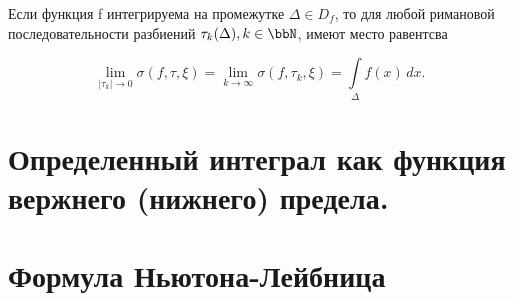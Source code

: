 \begin{thm}
Если функция f интегрируема на промежутке $\Delta \in D_f$, то для любой римановой последовательности разбиений $\tau_k(\Delta), k\in \bbN$, имеют место равентсва

\begin{equation} \label{ch11.1eq1}
\lim_{|\tau_k| \to 0} \sigma(f, \tau, \xi) = \lim_{k \to \infty} \sigma(f, \tau_k, \xi) = \int\limits_{\Delta} f(x) \,dx.
\end{equation}
\end{thm}

\section{Определенный интеграл как функция вержнего (нижнего) предела.}



\section{Формула Ньютона-Лейбница}